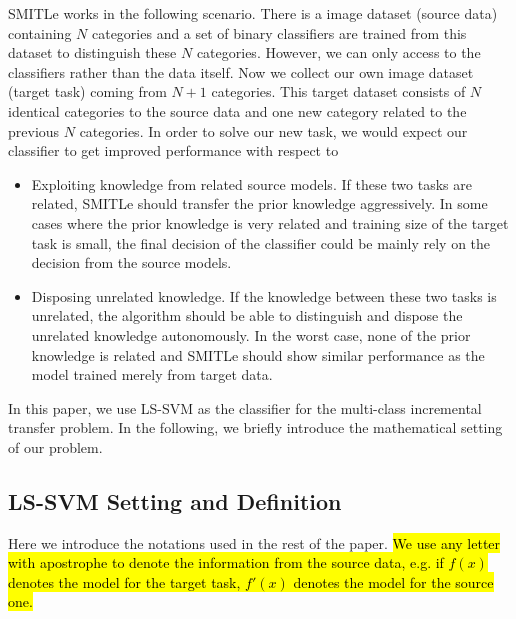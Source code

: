 SMITLe works in the following scenario. There is a image dataset (source data) containing $N$ categories and a set of binary classifiers are trained from this dataset to distinguish these $N$ categories. However, we can only access to the classifiers rather than the data itself. Now we collect our own image dataset (target task) coming from $N+1$ categories. This target dataset consists of $N$ identical categories to the source data and one new category related to the previous $N$ categories. In order to solve our new task, we would expect our classifier to get improved performance with respect to 
\begin{itemize}
\item Exploiting knowledge from related source models. If these two tasks are related, SMITLe should transfer the prior knowledge aggressively. In some cases where the prior knowledge is very related and training size of the target task is small, the final decision of the classifier could be mainly rely on the decision from the source models.
\item Disposing unrelated knowledge. If the knowledge between these two tasks is unrelated, the algorithm should be able to distinguish and dispose the unrelated knowledge autonomously. In the worst case, none of the prior knowledge is related and SMITLe should show similar performance as the model trained merely from target data.
\end{itemize}

In this paper, we use LS-SVM as the classifier for the multi-class incremental transfer problem. In the following, we briefly introduce the mathematical setting of our problem.

\subsection{LS-SVM Setting and Definition}
Here we introduce the notations used in the rest of the paper. \hl{We use any letter with apostrophe to denote the information from the source data, e.g. if $f(x)$ denotes the model for the target task, $f'(x)$ denotes the model for the source one.}

